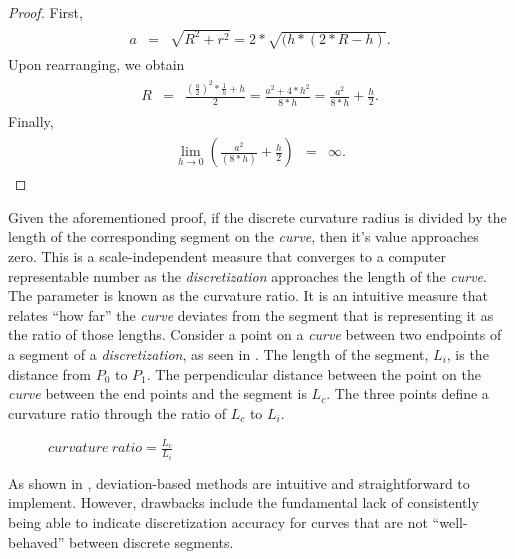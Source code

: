 \begin{proof}
First, 
\begin{eqnarray}
\begin{array}{lcl}
a & = & \sqrt{R^2+r^2}=2*\sqrt{(h*(2*R-h)}.
\end{array}
\end{eqnarray}
Upon rearranging, we obtain
\begin{eqnarray}
\begin{array}{lcl}
R & = & \frac{(\frac{a}{2})^2*\frac{1}{h}+h}{2}=
\frac{a^2+4*h^2}{8*h}=\frac{a^2}{8*h}+\frac{h}{2}.
\end{array}
\end{eqnarray}
Finally,
\begin{eqnarray}
\begin{array}{lcl}
\lim_{h\to0} (\frac{a^2}{(8*h)}+\frac{h}{2}) & = & \infty.
\end{array}
\end{eqnarray}
\end{proof}

Given the aforementioned proof, if the discrete curvature radius is 
divided by the length of the corresponding segment on the \textit{curve}, then it’s value approaches zero. This is a scale-independent measure that converges to a computer representable number as the \textit{discretization} approaches the length of the \textit{curve}. The parameter is known as the curvature ratio. It is an intuitive measure that relates ``how far'' the \textit{curve} deviates from the segment that is representing it as the ratio of those lengths. Consider a point on a \textit{curve} between two endpoints of a segment of a \textit{discretization}, as seen in . The length of the segment, $L_i$, is the distance from $P_0$ to $P_1$. The perpendicular distance between the point on the \textit{curve} between the end points and the segment is $L_c$. The three points define a curvature ratio through the ratio of $L_c$ to $L_i$.

\begin{figure}[h!]
  \caption{\label{ref:CurvatureRatio} $curvature \ ratio=  
\frac{L_c}{L_i}$ 
\cite{mclaurin10}}
\end{figure}

\noindent As shown in \cite{mclaurin12}, deviation-based methods are 
intuitive and straightforward to implement. However, drawbacks include the fundamental lack of consistently being able to indicate discretization accuracy for curves that are not ``well-behaved'' between discrete segments.
